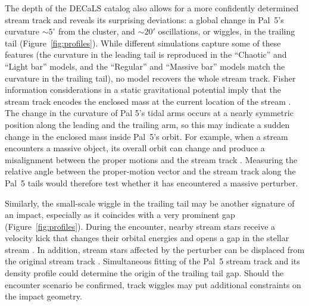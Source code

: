 \documentclass[twocolumn]{aastex62}
\newcommand{\ab}[1]{{\color{teal} AB: #1}}
\newcommand{\sa}[1]{{\color{magenta} SP: #1}}
\begin{document}
The depth of the DECaLS catalog also allows for a more confidently determined stream track and reveals its surprising deviations: a global change in Pal~5's curvature $\sim5^\circ$ from the cluster, and $\sim20'$ oscillations, or wiggles, in the trailing tail (Figure~\ref{fig:profiles}).
While different simulations capture some of these features (the curvature in the leading tail is reproduced in the ``Chaotic'' and ``Light bar'' models, and the ``Regular'' and ``Massive bar'' models match the curvature in the trailing tail), no model recovers the whole stream track.
Fisher information considerations in a static gravitational potential imply that the stream track encodes the enclosed mass at the current location of the stream \citep{Bonaca:2018}.
The change in the curvature of Pal 5’s tidal arms occurs at a nearly symmetric position along the leading and the trailing arm, so this may indicate a sudden change in the enclosed mass inside Pal~5's orbit.
For example, when a stream encounters a massive object, its overall orbit can change and produce a misalignment between the proper motions and the stream track \citep{Erkal:2018, Koposov:2019}.
Measuring the relative angle between the proper-motion vector and the stream track along the Pal~5 tails would therefore test whether it has encountered a massive perturber.

Similarly, the small-scale wiggle in the trailing tail may be another signature of an impact, especially as it coincides with a very prominent gap (Figure~\ref{fig:profiles}).
During the encounter, nearby stream stars receive a velocity kick that changes their orbital energies and opens a gap in the stellar stream \citep[e.g.,][]{Erkal:2015b}.
In addition, stream stars affected by the perturber can be displaced from the original stream track \citep{Bonaca:2018b}.
Simultaneous fitting of the Pal~5 stream track and its density profile could determine the origin of the trailing tail gap.
Should the encounter scenario be confirmed, track wiggles may put additional constraints on the impact geometry.


\end{document}
